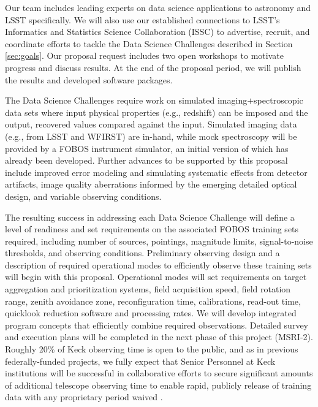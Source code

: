 \documentclass[oneside,11pt]{amsart}
\begin{document}
Our team includes leading experts on data science applications to astronomy and LSST specifically.  We will also use
our established connections to LSST's Informatics and Statistics Science Collaboration (ISSC) to advertise, recruit,
and coordinate efforts to tackle the Data Science Challenges described in Section \ref{sec:goals}.  Our proposal
request includes two open workshops to motivate progress and discuss results. At the end of the proposal period, we
will publish the results and developed software packages.

The Data Science Challenges require work on simulated imaging$+$spectroscopic data sets where input physical properties
(e.g., redshift) can be imposed and the output, recovered values compared against the input.  Simulated imaging data
(e.g., from LSST and WFIRST) are in-hand, while mock spectroscopy will be provided by a FOBOS instrument simulator,
an initial version of which has already been developed.  Further advances to be supported by this proposal include
improved error modeling and simulating systematic effects from detector artifacts, image quality aberrations informed
by the emerging detailed optical design, and variable observing conditions.

The resulting success in addressing each Data Science Challenge will define a level of readiness and set requirements
on the associated FOBOS training sets required, including number of sources, pointings, magnitude limits,
signal-to-noise thresholds, and observing conditions.  Preliminary observing design and a description of required
operational modes to efficiently observe these training sets will begin with this proposal.  Operational modes will set
requirements on target aggregation and prioritization systems, field acquisition speed, field rotation range, zenith
avoidance zone, reconfiguration time, calibrations, read-out time, quicklook reduction software and processing rates.
We will develop integrated program concepts that efficiently combine required observations.  Detailed survey and
execution plans will be completed in the next phase of this project (MSRI-2).  Roughly 20\% of Keck observing time is
open to the public, and as in previous federally-funded projects, we fully expect that Senior Personnel at Keck
institutions will be successful in collaborative efforts to secure significant amounts of additional telescope
observing time to enable rapid, publicly release of training data with any proprietary period waived
\citep[e.g.,][]{newman13}.

\end{document}
